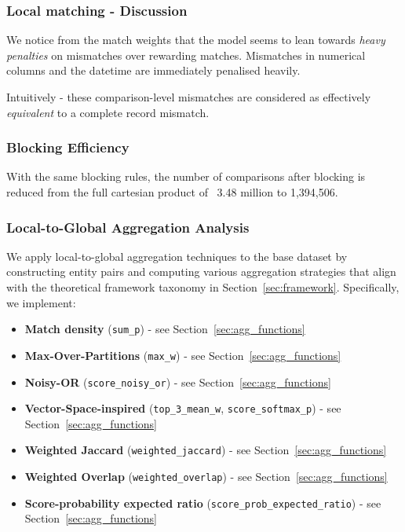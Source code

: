 \subsubsection{Local matching - Discussion}
We notice from the match weights that the model seems to lean towards \textit{heavy penalties} on mismatches over rewarding matches. Mismatches in numerical columns and the datetime are immediately penalised heavily. 

Intuitively - these comparison-level mismatches are considered as effectively \textit{equivalent} to a complete record mismatch.
\subsubsection{Blocking Efficiency}
With the same blocking rules, the number of comparisons after blocking is reduced from the full cartesian product of ~3.48 million to 1,394,506.

\subsubsection{Local-to-Global Aggregation Analysis}
We apply local-to-global aggregation techniques to the base dataset by constructing entity pairs and computing various aggregation strategies that align with the theoretical framework taxonomy in Section~\ref{sec:framework}. Specifically, we implement:
\begin{itemize}
    \item \textbf{Match density} (\texttt{sum\_p}) - see Section~\ref{sec:agg_functions}
    \item \textbf{Max-Over-Partitions} (\texttt{max\_w}) - see Section~\ref{sec:agg_functions}
    \item \textbf{Noisy-OR} (\texttt{score\_noisy\_or}) - see Section~\ref{sec:agg_functions}
    \item \textbf{Vector-Space-inspired} (\texttt{top\_3\_mean\_w}, \texttt{score\_softmax\_p}) - see Section~\ref{sec:agg_functions}
    \item \textbf{Weighted Jaccard} (\texttt{weighted\_jaccard}) - see Section~\ref{sec:agg_functions}
    \item \textbf{Weighted Overlap} (\texttt{weighted\_overlap}) - see Section~\ref{sec:agg_functions}
    \item \textbf{Score-probability expected ratio} (\texttt{score\_prob\_expected\_ratio}) - see Section~\ref{sec:agg_functions}
\end{itemize}

